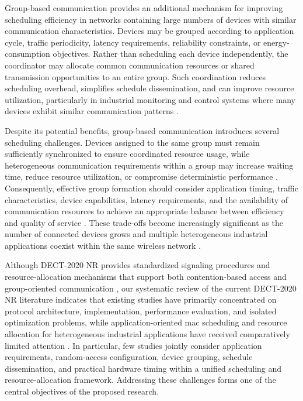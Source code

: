 \documentclass[12pt,a4paper]{article}
\begin{document}
Group-based communication provides an additional mechanism for improving scheduling efficiency in networks containing large numbers of devices with similar communication characteristics. Devices may be grouped according to application cycle, traffic periodicity, latency requirements, reliability constraints, or energy-consumption objectives. Rather than scheduling each device independently, the coordinator may allocate common communication resources or shared transmission opportunities to an entire group. Such coordination reduces scheduling overhead, simplifies schedule dissemination, and can improve resource utilization, particularly in industrial monitoring and control systems where many devices exhibit similar communication patterns \cite{etsi_ts103636_4}.

Despite its potential benefits, group-based communication introduces several scheduling challenges. Devices assigned to the same group must remain sufficiently synchronized to ensure coordinated resource usage, while heterogeneous communication requirements within a group may increase waiting time, reduce resource utilization, or compromise deterministic performance \cite{willigWirelessTechnologyIndustrial2005,vitturiIndustrialWirelessNetworks2013}. Consequently, effective group formation should consider application timing, traffic characteristics, device capabilities, latency requirements, and the availability of communication resources to achieve an appropriate balance between efficiency and quality of service \cite{andrewsProvidingQualityService2001,fattahOverviewSchedulingAlgorithms2002a}. These trade-offs become increasingly significant as the number of connected devices grows and multiple heterogeneous industrial applications coexist within the same wireless network \cite{wollschlaegerFutureIndustrialCommunication2017a}.

Although DECT-2020 NR provides standardized signaling procedures and
resource-allocation mechanisms that support both contention-based access and
group-oriented communication \cite{etsi_ts103636_4}, our systematic review of
the current DECT-2020 NR literature indicates that existing studies have
primarily concentrated on protocol architecture, implementation, performance
evaluation, and isolated optimization problems, while application-oriented
\gls{mac} scheduling and resource allocation for heterogeneous industrial
applications have received comparatively limited attention
\cite{gaidamakaOptimizingDelaysRandom2025,kovalchukovDECT2020NewRadio2022}.
In particular, few studies jointly consider application requirements,
random-access configuration, device grouping, schedule dissemination, and
practical hardware timing within a unified scheduling and resource-allocation
framework. Addressing these challenges forms one of the central objectives of
the proposed research.
\end{document}
